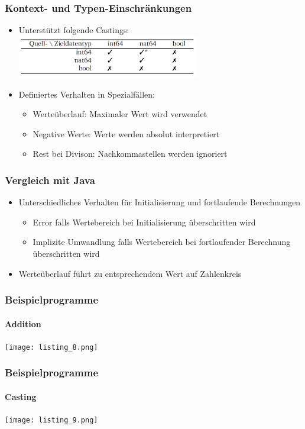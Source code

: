 \documentclass{beamer}
\begin{document}
    \begin{frame}
        \frametitle{Kontext- und Typen-Einschränkungen}
        \begin{itemize}
            \item Unterstützt folgende Castings:
            {\includegraphics[width=8cm]{listing_7.png}}
            \item Definiertes Verhalten in Spezialfällen:
                \begin{itemize}
                    \item Werteüberlauf: Maximaler Wert wird verwendet
                    \item Negative Werte: Werte werden absolut interpretiert
                    \item Rest bei Divison: Nachkommastellen werden ignoriert
                \end{itemize}
        \end{itemize}
        \vspace{30}
    \end{frame}

    \begin{frame}
        \frametitle{Vergleich mit Java}
        \begin{itemize}
            \item Unterschiedliches Verhalten für Initialisierung und fortlaufende Berechnungen
            \begin{itemize}
                \item Error falls Wertebereich bei Initialisierung überschritten wird
                \item Implizite Umwandlung falls Wertebereich bei fortlaufender Berechnung überschritten wird
            \end{itemize}
            \item Werteüberlauf führt zu entsprechendem Wert auf Zahlenkreis
        \end{itemize}
        \vspace{30}
    \end{frame}

    \begin{frame}
        \frametitle{Beispielprogramme}
        \framesubtitle{Addition}
        {\texttt{[image: listing\_8.png]}}
        \vspace{30}
    \end{frame}

    \begin{frame}
        \frametitle{Beispielprogramme}
        \framesubtitle{Casting}
        {\texttt{[image: listing\_9.png]}}
        \vspace{30}
    \end{frame}
\end{document}

